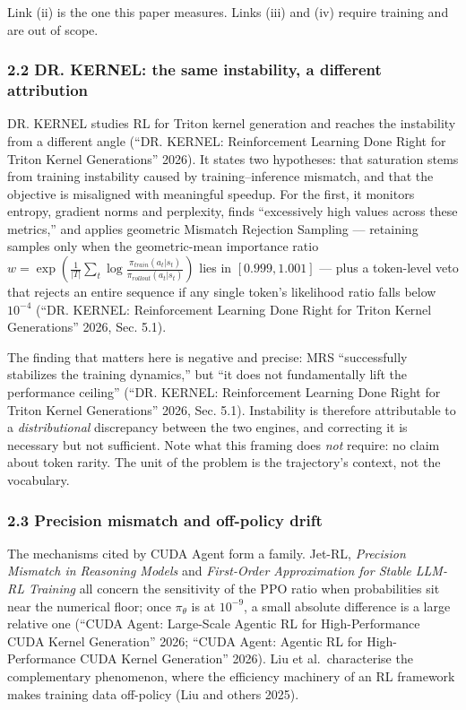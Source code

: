 \documentclass[
  11pt,
]{article}
\begin{document}
Link (ii) is the one this paper measures. Links (iii) and (iv) require
training and are out of scope.

\hypertarget{dr.-kernel-the-same-instability-a-different-attribution}{%
\subsubsection{2.2 DR. KERNEL: the same instability, a different
attribution}\label{dr.-kernel-the-same-instability-a-different-attribution}}

DR. KERNEL studies RL for Triton kernel generation and reaches the
instability from a different angle ({``{DR. KERNEL}: Reinforcement
Learning Done Right for {Triton} Kernel Generations''} 2026). It states
two hypotheses: that saturation stems from training instability caused
by training--inference mismatch, and that the objective is misaligned
with meaningful speedup. For the first, it monitors entropy, gradient
norms and perplexity, finds ``excessively high values across these
metrics,'' and applies geometric Mismatch Rejection Sampling ---
retaining samples only when the geometric-mean importance ratio
\(w = \exp(\frac{1}{|T|}\sum_t \log \frac{\pi_{train}(a_t|s_t)}{\pi_{rollout}(a_t|s_t)})\)
lies in \([0.999, 1.001]\) --- plus a token-level veto that rejects an
entire sequence if any single token's likelihood ratio falls below
\(10^{-4}\) ({``{DR. KERNEL}: Reinforcement Learning Done Right for
{Triton} Kernel Generations''} 2026, Sec. 5.1).

The finding that matters here is negative and precise: MRS
``successfully stabilizes the training dynamics,'' but ``it does not
fundamentally lift the performance ceiling'' ({``{DR. KERNEL}:
Reinforcement Learning Done Right for {Triton} Kernel Generations''}
2026, Sec. 5.1). Instability is therefore attributable to a
\emph{distributional} discrepancy between the two engines, and
correcting it is necessary but not sufficient. Note what this framing
does \emph{not} require: no claim about token rarity. The unit of the
problem is the trajectory's context, not the vocabulary.

\hypertarget{precision-mismatch-and-off-policy-drift}{%
\subsubsection{2.3 Precision mismatch and off-policy
drift}\label{precision-mismatch-and-off-policy-drift}}

The mechanisms cited by CUDA Agent form a family. Jet-RL,
\emph{Precision Mismatch in Reasoning Models} and \emph{First-Order
Approximation for Stable LLM-RL Training} all concern the sensitivity of
the PPO ratio when probabilities sit near the numerical floor; once
\(\pi_\theta\) is at \(10^{-9}\), a small absolute difference is a large
relative one ({``{CUDA Agent}: Large-Scale Agentic {RL} for
High-Performance {CUDA} Kernel Generation''} 2026; {``{CUDA Agent}:
Agentic {RL} for High-Performance {CUDA} Kernel Generation''} 2026). Liu
et al.~characterise the complementary phenomenon, where the efficiency
machinery of an RL framework makes training data off-policy (Liu and
others 2025).
\end{document}
